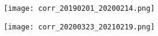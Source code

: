 \documentclass[12pt]{article}
\begin{document}
\pagebreak

\begin{figure}
    \centering
    \texttt{[image: corr\_20190201\_20200214.png]}
    \caption{}
    \label{fig:Ng1}

    \bigbreak

    \texttt{[image: corr\_20200323\_20210219.png]}
    \caption{}
    \label{fig:Ng2}
\end{figure}

% 
% 

\printbibliography
\end{document}
